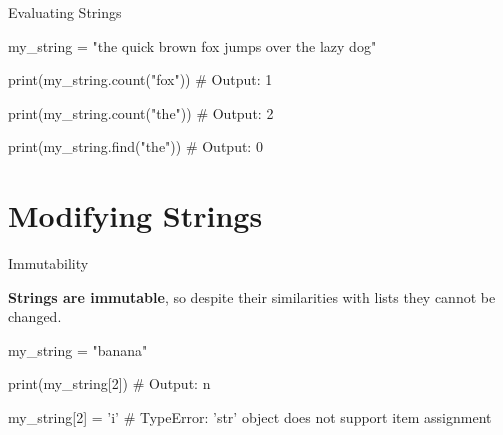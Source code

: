 \begin{frame}[fragile]{Evaluating Strings}

    \begin{pythoncode}

my_string = "the quick brown fox jumps over the lazy dog"

print(my_string.count("fox"))
# Output: 1

print(my_string.count("the"))
# Output: 2

print(my_string.find("the"))
# Output: 0

    \end{pythoncode}


\end{frame}

\section{Modifying Strings}

\begin{frame}[plain]
    \sectionpage
\end{frame}

\begin{frame}[fragile]{Immutability}

    \textbf{Strings are immutable}, so despite their similarities with lists they cannot be changed.

    \begin{pythoncode}

my_string = "banana"

print(my_string[2])
# Output: n

my_string[2] = 'i'
# TypeError: 'str' object does not support item assignment
    
    \end{pythoncode}


\end{frame}

